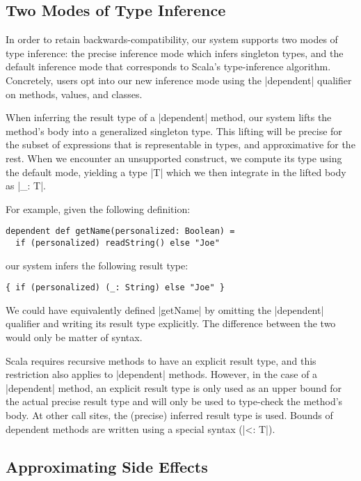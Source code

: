 \subsection{Two Modes of Type Inference}

In order to retain backwards-compatibility, our system supports two modes of type inference: the precise inference mode which infers singleton types, and the default inference mode that corresponds to Scala's type-inference algorithm.
Concretely, users opt into our new inference mode using the |dependent| qualifier on methods, values, and classes.

When inferring the result type of a |dependent| method, our system lifts the method's body into a generalized singleton type.
This lifting will be precise for the subset of expressions that is representable in types, and approximative for the rest.
When we encounter an unsupported construct, we compute its type using the default mode, yielding a type |T| which we then integrate in the lifted body as |_: T|.

For example, given the following definition:

\begin{lstlisting}
dependent def getName(personalized: Boolean) =
  if (personalized) readString() else "Joe"
\end{lstlisting}

\noindent
our system infers the following result type:

\begin{lstlisting}
{ if (personalized) (_: String) else "Joe" }
\end{lstlisting}

\noindent
We could have equivalently defined |getName| by omitting the |dependent| qualifier and writing its result type explicitly.
The difference between the two would only be matter of syntax.

Scala requires recursive methods to have an explicit result type, and this restriction also applies to |dependent| methods.
However, in the case of a |dependent| method, an explicit result type is only used as an upper bound for the actual precise result type and will only be used to type-check the method's body.
At other call sites, the (precise) inferred result type is used.
Bounds of dependent methods are written using a special syntax (|<: T|).

\subsection{Approximating Side Effects}

